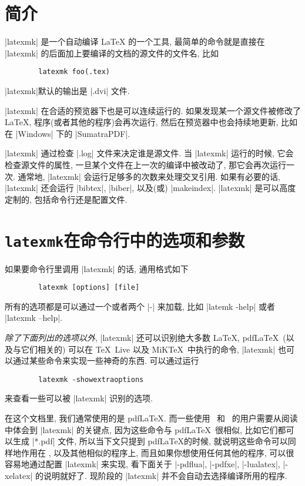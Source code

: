 \documentclass{ctexart}
\begin{document}
\DefineShortVerb{\|}
\section{简介}
	|latexmk| 是一个自动编译 \LaTeX{} 的一个工具, 最简单的命令就是直接在 |latexmk| 的后面加上要编译的文档的源文件的文件名, 比如
	\begin{Verbatim}
		latexmk foo(.tex)
	\end{Verbatim}
	|latexmk|默认的输出是 |.dvi| 文件.

	|latexmk| 在合适的预览器下也是可以连续运行的. 如果发现某一个源文件被修改了 \LaTeX{}, 程序(或者其他的程序)会再次运行, 然后在预览器中也会持续地更新, 比如在 |Windows| 下的 |SumatraPDF|.

	|latexmk| 通过检查 |.log| 文件来决定谁是源文件. 当 |latexmk| 运行的时候, 它会检查源文件的属性, 一旦某个文件在上一次的编译中被改动了, 那它会再次运行一次. 通常地,  |latexmk| 会运行足够多的次数来处理交叉引用. 如果有必要的话, |latexmk| 还会运行 |bibtex|, |biber|, 以及(或) |makeindex|. |latexmk| 是可以高度定制的, 包括命令行还是配置文件.

\section{\texttt{latexmk}在命令行中的选项和参数}
	如果要命令行里调用 |latexmk| 的话, 通用格式如下
	\begin{Verbatim}
		latexmk [options] [file]
	\end{Verbatim}
	所有的选项都是可以通过一个或者两个 |-| 来加载, 比如 |latemk -help| 或者 |latexmk --help|.
	\begin{Remark}
		\emph{除了下面列出的选项以外}, |latexmk| 还可以识别绝大多数 \LaTeX, pdf\LaTeX\ (以及与它们相关的) 可以在 \TeX\ Live 以及 MiK\TeX\ 中执行的命令, |latexmk| 也可以通过某些命令来实现一些神奇的东西. 可以通过运行
	\begin{Verbatim}
		latexmk -showextraoptions
	\end{Verbatim}
		来查看一些可以被 |latexmk| 识别的选项.
	\end{Remark}
	\begin{Remark}
		在这个文档里, 我们通常使用的是 pdf\LaTeX. 而一些使用 \LuaLaTeX\ 和 \XeLaTeX\ 的用户需要从阅读中体会到 |latexmk| 的关键点, 因为这些命令与 pdf\LaTeX\ 很相似, 比如它们都可以生成 |*.pdf| 文件, 所以当下文只提到 pdf\LaTeX 的时候, 就说明这些命令可以同样地作用在 \XeLaTeX, \LuaLaTeX 以及其他相似的程序上, 而且如果你想使用任何其他的程序, 可以很容易地通过配置 |latexmk| 来实现, 看下面关于 |-pdflua|, |-pdfxe|, |-lualatex|, |-xelatex| 的说明就好了. 现阶段的 |latexmk| 并不会自动去选择编译所用的程序.
	\end{Remark}
\end{document}
